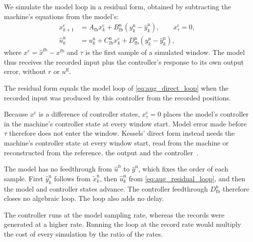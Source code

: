 We simulate the model loop in a residual form, obtained by subtracting the
machine's equations from the model's:
\begin{equation}
\begin{aligned}
 x^{\mathrm c}_{k+1}&=A_{\mathrm{fb}}x^{\mathrm c}_k+B^{\mathrm n}_{\mathrm{fb}}(y^{\mathrm n}_k-\hat y^{\mathrm n}_k),
 \qquad x^{\mathrm c}_\tau=0,\\
 \hat u^{\mathrm n}_k&=u^{\mathrm n}_k+C^{\mathrm n}_{\mathrm{fb}}x^{\mathrm c}_k
 +D^{\mathrm n}_{\mathrm{fb}}(y^{\mathrm n}_k-\hat y^{\mathrm n}_k),
\end{aligned}
\label{eq:aug_residual_loop}
\end{equation}
where $x^{\mathrm c}=\hat x^{\mathrm{fb}}-x^{\mathrm{fb}}$ and $\tau$ is the
first sample of a simulated window.
The model thus receives the recorded input plus the controller's response to
its own output error, without $r$ or $u^{\mathrm{ff}}$.

The residual form equals the model loop of \eqref{eq:aug_direct_loop} when the
recorded input was produced by this controller from the recorded positions.

Because $x^{\mathrm c}$ is a difference of controller states,
$x^{\mathrm c}_\tau=0$ places the model's controller in the machine's
controller state at every window start.
Model error made before $\tau$ therefore does not enter the window.
Kessels' direct form instead needs the machine's controller state at every
window start, read from the machine or reconstructed from the reference, the
output and the controller~\cite[Remark~5.4]{kessels2025ai}.

The model has no feedthrough from $\hat u^{\mathrm n}$ to
$\hat y^{\mathrm n}$, which fixes the order of each sample.
First $\hat y^{\mathrm n}_k$ follows from $\tilde x^{\mathrm n}_k$, then
$\hat u^{\mathrm n}_k$ from \eqref{eq:aug_residual_loop}, and then the model
and controller states advance.
The controller feedthrough $D^{\mathrm n}_{\mathrm{fb}}$ therefore closes no
algebraic loop.
The loop also adds no delay.

The controller runs at the model sampling rate, whereas the records were
generated at a higher rate.
Running the loop at the record rate would multiply the cost of every
simulation by the ratio of the rates.

